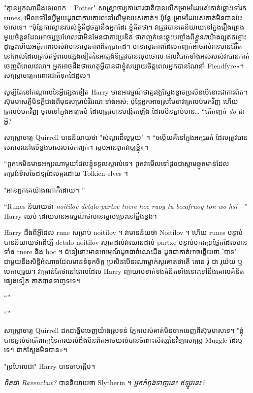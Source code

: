 "គ្មានអ្នកណាដឹងទេលោក ~ Potter" សាស្រ្តាចារ្យការពារជាតិបានលើកម្រាមដៃរបស់គាត់ឆ្ពោះទៅរក runes, មើលទៅនៃអ្វីមួយដូចជាការគោរពនៅលើមុខរបស់គាត់។ ប៉ុន្តែ ម្រាមដៃរបស់គាត់មិនបានប៉ះមាសទេ។ “ប៉ុន្តែការស្មានរបស់ខ្ញុំគឺដូចគ្នានឹងអ្នកដែរ ខ្ញុំគិតថា។ វាត្រូវបានគេនិយាយនៅក្នុងរឿងព្រេងមួយចំនួនដែលអាចឬប្រហែលជាមិនមែនជាការប្រឌិត ថាកញ្ចក់នេះឆ្លុះបញ្ចាំងពី\emph{ខ្លួនវា}យ៉ាងល្អឥតខ្ចោះ ដូច្នេះហើយអត្ថិភាពរបស់វាមានស្ថេរភាពពិតប្រាកដ។ មានស្ថេរភាពដែលកញ្ចក់អាចរស់រានមានជីវិតនៅពេលដែលគ្រប់ឥទ្ធិពលផ្សេងទៀតនៃអាត្លង់ទីត្រូវបានលុបចោល ផលវិបាកទាំងអស់របស់វាបានកាត់ចេញពីពេលវេលា។ អ្នក​អាច​ដឹង​ថា​ហេតុ​អ្វី​បាន​ជា​ខ្ញុំ​សប្បាយ​ចិត្ត​ពេល​អ្នក​បាន​ណែនាំ Fiendfyre»។ សាស្ត្រាចារ្យ​ការពារ​ជាតិ​ទុក​ដៃ​ដួល។

សូម្បី​តែ​នៅ​កណ្តាល​នៃ​អ្វី​ផ្សេង​ទៀត Harry មាន​អារម្មណ៍​ថា​គួរ​ឱ្យ​ស្ញែង​ខ្លាច​ប្រសិន​បើ​នោះ​ជា​ការ​ពិត​។ ស៊ុមមាសភ្លឺមិនភ្លឺជាងពីមុនសម្រាប់វិវរណៈទាំងអស់; ប៉ុន្តែអ្នកអាចស្រមៃថាវាត្រលប់មកវិញ ហើយត្រលប់មកវិញ ចូលទៅក្នុងអារ្យធម៌ ដែលត្រូវបានបង្កើតឡើង ដែលមិនធ្លាប់មាន… “តើកញ្ចក់ \emph{do} ជាអ្វី?

សាស្រ្តាចារ្យ Quirrell បាននិយាយថា "សំណួរដ៏ល្អមួយ" ។ “ចម្លើយគឺនៅក្នុងអក្សររត់ ដែលត្រូវបានសរសេរនៅលើខ្នងមាសរបស់កញ្ចក់។ សូម​អាន​ពួក​វា​ឲ្យ​ខ្ញុំ»។

“ពួកគេមិនមានអក្សរណាមួយដែលខ្ញុំទទួលស្គាល់ទេ។ ពួកវាមើលទៅដូចជាស្នាមឆ្កូតមាន់ដែលតម្រង់ទិសចៃដន្យដែលគូរដោយ Tolkien elves ។

"អានពួកគេយ៉ាងណាក៏ដោយ។ ”

“Runes និយាយថា \emph{noitilov detalo partxe tnere hoc ruoy tu becafruoy ton wo hsi—}” Harry ឈប់ ដោយមានអារម្មណ៍ថាមានស្នាមប្រេះនៅឆ្អឹងខ្នង។

Harry ដឹងពីអ្វីដែល rune សម្រាប់ noitilov \emph{{}}។ វាមានន័យថា Noitilov ។ ហើយ runes បន្ទាប់បាននិយាយថាដើម្បី detalo noitilov រហូតដល់វាឈានដល់ partxe បន្ទាប់មករក្សាផ្នែកដែលមានទាំង tnere និង hoc ។ ជំនឿនោះមានអារម្មណ៍ដូចជាចំណេះដឹង ដូចជាគាត់អាចឆ្លើយថា 'បាទ' ជាមួយនឹងសិទ្ធិអំណាចដែលមានទំនុកចិត្ត ប្រសិនបើនរណាម្នាក់សួរគាត់ថាតើ តោន វ៉ូ ជា រូយ៉យ ឬ បេកាហ្វរូយ។ វាគ្រាន់តែថានៅពេលដែល Harry ព្យាយាមទាក់ទងគំនិតទាំងនោះទៅនឹងគោលគំនិតផ្សេងទៀត គាត់បានទាញទទេ។

“”

“”

សាស្ត្រាចារ្យ Quirrell ដកដង្ហើមចេញយ៉ាងស្រទន់ ភ្នែករបស់គាត់មិនចាកចេញពីស៊ុមមាសទេ។ "ខ្ញុំបានឆ្ងល់ថាតើពាក្យនៃការយល់ដឹងមិនពិតអាចយល់បានចំពោះសិស្សនៃវិទ្យាសាស្ត្រ Muggle ដែរឬទេ។ ជាក់​ស្តែង​មិន​បាន»។

"ប្រហែលជា" Harry បានចាប់ផ្តើម។

\emph{ពិតជា Ravenclaw?} បាននិយាយថា Slytherin ។ \emph{អ្នកកំពុងទាញនេះ \emph{ឥឡូវនេះ}?}

